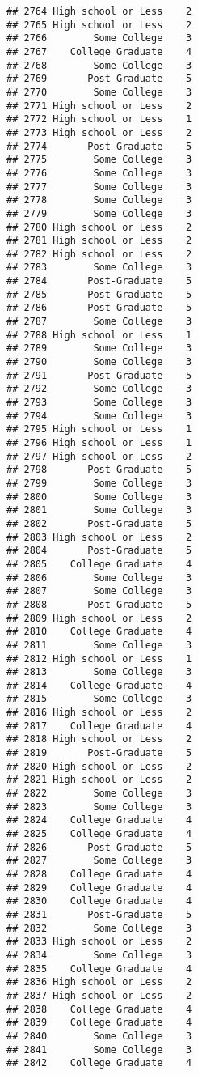 \documentclass[
]{article}
\begin{document}
\begin{verbatim}
## 2764 High school or Less    2
## 2765 High school or Less    2
## 2766        Some College    3
## 2767    College Graduate    4
## 2768        Some College    3
## 2769       Post-Graduate    5
## 2770        Some College    3
## 2771 High school or Less    2
## 2772 High school or Less    1
## 2773 High school or Less    2
## 2774       Post-Graduate    5
## 2775        Some College    3
## 2776        Some College    3
## 2777        Some College    3
## 2778        Some College    3
## 2779        Some College    3
## 2780 High school or Less    2
## 2781 High school or Less    2
## 2782 High school or Less    2
## 2783        Some College    3
## 2784       Post-Graduate    5
## 2785       Post-Graduate    5
## 2786       Post-Graduate    5
## 2787        Some College    3
## 2788 High school or Less    1
## 2789        Some College    3
## 2790        Some College    3
## 2791       Post-Graduate    5
## 2792        Some College    3
## 2793        Some College    3
## 2794        Some College    3
## 2795 High school or Less    1
## 2796 High school or Less    1
## 2797 High school or Less    2
## 2798       Post-Graduate    5
## 2799        Some College    3
## 2800        Some College    3
## 2801        Some College    3
## 2802       Post-Graduate    5
## 2803 High school or Less    2
## 2804       Post-Graduate    5
## 2805    College Graduate    4
## 2806        Some College    3
## 2807        Some College    3
## 2808       Post-Graduate    5
## 2809 High school or Less    2
## 2810    College Graduate    4
## 2811        Some College    3
## 2812 High school or Less    1
## 2813        Some College    3
## 2814    College Graduate    4
## 2815        Some College    3
## 2816 High school or Less    2
## 2817    College Graduate    4
## 2818 High school or Less    2
## 2819       Post-Graduate    5
## 2820 High school or Less    2
## 2821 High school or Less    2
## 2822        Some College    3
## 2823        Some College    3
## 2824    College Graduate    4
## 2825    College Graduate    4
## 2826       Post-Graduate    5
## 2827        Some College    3
## 2828    College Graduate    4
## 2829    College Graduate    4
## 2830    College Graduate    4
## 2831       Post-Graduate    5
## 2832        Some College    3
## 2833 High school or Less    2
## 2834        Some College    3
## 2835    College Graduate    4
## 2836 High school or Less    2
## 2837 High school or Less    2
## 2838    College Graduate    4
## 2839    College Graduate    4
## 2840        Some College    3
## 2841        Some College    3
## 2842    College Graduate    4

\end{verbatim}
\end{document}
